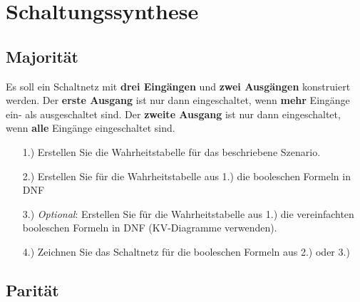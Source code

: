 
\part{Schaltungssynthese}
\label{part-schaltungssynthese}

\togglefalse{image}
\togglefalse{imagehover}

\chapter{Majorität}
\label{ch:majoritaet}

\begin{exercise}
Es soll ein Schaltnetz mit \textbf{drei Eingängen} und \textbf{zwei Ausgängen} konstruiert werden. Der \textbf{erste Ausgang} ist nur dann eingeschaltet, wenn \textbf{mehr} Eingänge ein- als ausgeschaltet sind. Der \textbf{zweite Ausgang} ist nur dann eingeschaltet, wenn \textbf{alle} Eingänge eingeschaltet sind.

\begin{enumerate}
\item[1.)] Erstellen Sie die Wahrheitstabelle für das beschriebene Szenario.
\item[2.)] Erstellen Sie für die Wahrheitstabelle aus 1.) die booleschen Formeln in \ac{DNF}
\item[3.)] \textit{Optional}: Erstellen Sie für die Wahrheitstabelle aus 1.) die vereinfachten booleschen Formeln in \ac{DNF} (\ac{KV}-Diagramme verwenden).
\item[4.)] Zeichnen Sie das Schaltnetz für die booleschen Formeln aus 2.) oder 3.)
\end{enumerate}
\end{exercise}


\newpage

\chapter{Parität}
\label{ch:paritaet}

